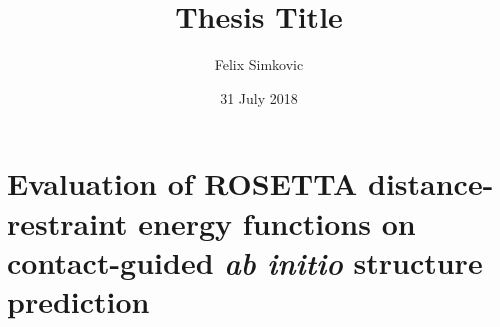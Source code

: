 \documentclass[11pt,oneside,leqno,openright]{report}
\title{Thesis Title}
\author{Felix Simkovic}
\date{31 July 2018}
\begin{document}
% 
%
% 
%
%
%

\tableofcontents

\listoffigures

\listoftables

% 

\chapter{Evaluation of ROSETTA distance-restraint energy functions on contact-guided \textit{ab initio} structure prediction}


% 
%
% 

\printbibliography
\end{document}
